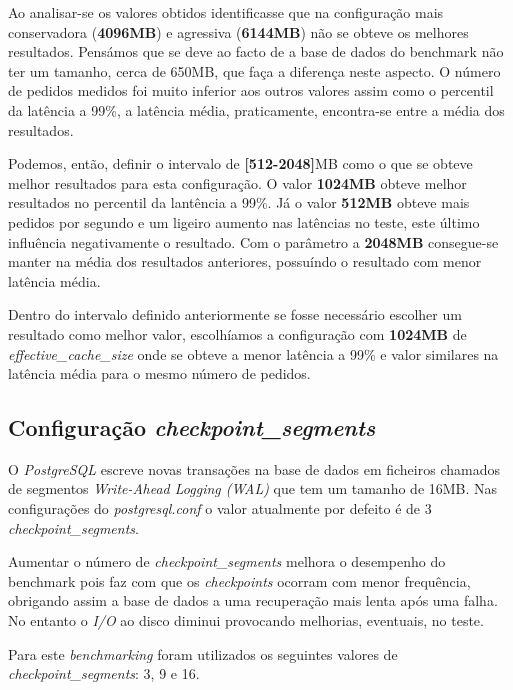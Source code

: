 Ao analisar-se os valores obtidos identificasse que na configuração mais conservadora (\textbf{4096MB}) e agressiva (\textbf{6144MB}) não se obteve os melhores resultados. Pensámos que se deve ao facto de a base de dados do benchmark não ter um tamanho, cerca de 650MB, que faça a diferença neste aspecto. O número de pedidos medidos foi muito inferior aos outros valores assim como o percentil da latência a 99\%, a latência média, praticamente, encontra-se entre a média dos resultados.

Podemos, então, definir o intervalo de \textbf{[512-2048]}MB como o que se obteve melhor resultados para esta configuração. O valor \textbf{1024MB} obteve melhor resultados no percentil da lantência a 99\%. Já o valor \textbf{512MB} obteve mais pedidos por segundo e um ligeiro aumento nas latências no teste, este último influência negativamente o resultado. Com o parâmetro a \textbf{2048MB} consegue-se manter na média dos resultados anteriores, possuíndo o resultado com menor latência média.

Dentro do intervalo definido anteriormente se fosse necessário escolher um resultado como melhor valor, escolhíamos a configuração com \textbf{1024MB} de \textit{effective\_cache\_size} onde se obteve a menor latência a 99\% e valor similares na latência média para o mesmo número de pedidos.

\newpage

\subsection{Configuração \textit{checkpoint\_segments}}

O \textit{PostgreSQL} escreve novas transações na base de dados em ficheiros chamados de segmentos \textit{Write-Ahead Logging (WAL)} que tem um tamanho de 16MB. Nas configurações do \textit{postgresql.conf} o valor atualmente por defeito é de 3 \textit{checkpoint\_segments}.

Aumentar o número de \textit{checkpoint\_segments} melhora o desempenho do benchmark pois faz com que os \textit{checkpoints} ocorram com menor frequência, obrigando assim a base de dados a uma recuperação mais lenta após uma falha. No entanto o \textit{I/O} ao disco diminui provocando melhorias, eventuais, no teste.

Para este \textit{benchmarking} foram utilizados os seguintes valores de \textit{checkpoint\_segments}: 3, 9 e 16.

